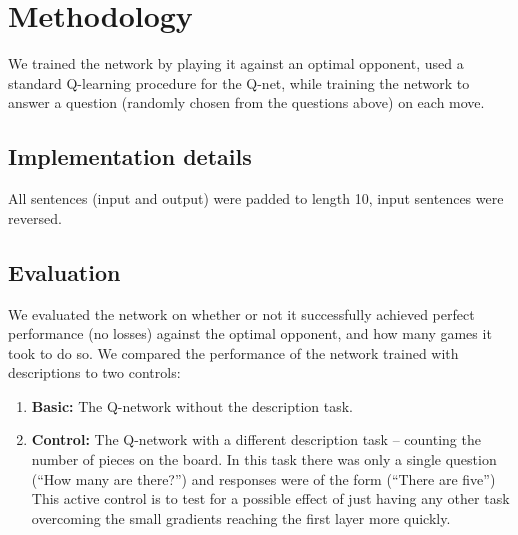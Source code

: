 \documentclass[11pt]{article}
\begin{document}
\section{Methodology}
We trained the network by playing it against an optimal opponent, used a standard Q-learning procedure for the Q-net, while training the network to answer a question (randomly chosen from the questions above) on each move. 
\subsection{Implementation details}
All sentences (input and output) were padded to length 10, input sentences were reversed.  

\subsection{Evaluation}
We evaluated the network on whether or not it successfully achieved perfect performance (no losses) against the optimal opponent, and how many games it took to do so. We compared the performance of the network trained with descriptions to two controls: 
\begin{enumerate}
\item \textbf{Basic:} The Q-network without the description task. 
\item \textbf{Control:} The Q-network with a different description task -- counting the number of pieces on the board. In this task there was only a single question (``How many are there?'') and responses were of the form (``There are five'') This active control is to test for a possible effect of just having any other task overcoming the small gradients reaching the first layer more quickly. 
\end{enumerate}


\end{document}
